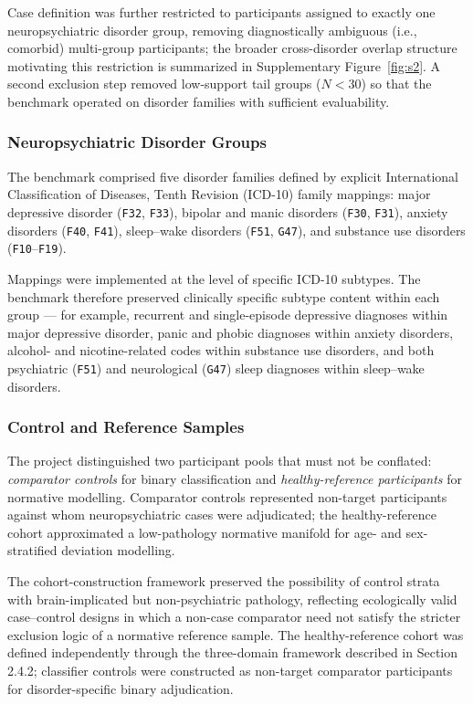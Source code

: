 \documentclass[11pt,a4paper,twoside]{article}
\begin{document}
Case definition was further restricted to participants assigned to exactly one neuropsychiatric disorder group, removing diagnostically ambiguous (i.e., comorbid) multi-group participants; the broader cross-disorder overlap structure motivating this restriction is summarized in Supplementary Figure~\ref{fig:s2}. A second exclusion step removed low-support tail groups ($N < 30$) so that the benchmark operated on disorder families with sufficient evaluability.

\subsubsection{Neuropsychiatric Disorder Groups}
The benchmark comprised five disorder families defined by explicit International Classification of Diseases, Tenth Revision (ICD-10) family mappings: major depressive disorder (\texttt{F32}, \texttt{F33}), bipolar and manic disorders (\texttt{F30}, \texttt{F31}), anxiety disorders (\texttt{F40}, \texttt{F41}), sleep--wake disorders (\texttt{F51}, \texttt{G47}), and substance use disorders (\texttt{F10}--\texttt{F19}).

Mappings were implemented at the level of specific ICD-10 subtypes. The benchmark therefore preserved clinically specific subtype content within each group --- for example, recurrent and single-episode depressive diagnoses within major depressive disorder, panic and phobic diagnoses within anxiety disorders, alcohol- and nicotine-related codes within substance use disorders, and both psychiatric (\texttt{F51}) and neurological (\texttt{G47}) sleep diagnoses within sleep--wake disorders.

\subsubsection{Control and Reference Samples}
The project distinguished two participant pools that must not be conflated: \textit{comparator controls} for binary classification and \textit{healthy-reference participants} for normative modelling. Comparator controls represented non-target participants against whom neuropsychiatric cases were adjudicated; the healthy-reference cohort approximated a low-pathology normative manifold for age- and sex-stratified deviation modelling.

The cohort-construction framework preserved the possibility of control strata with brain-implicated but non-psychiatric pathology, reflecting ecologically valid case--control designs in which a non-case comparator need not satisfy the stricter exclusion logic of a normative reference sample. The healthy-reference cohort was defined independently through the three-domain framework described in Section 2.4.2; classifier controls were constructed as non-target comparator participants for disorder-specific binary adjudication.
\end{document}
